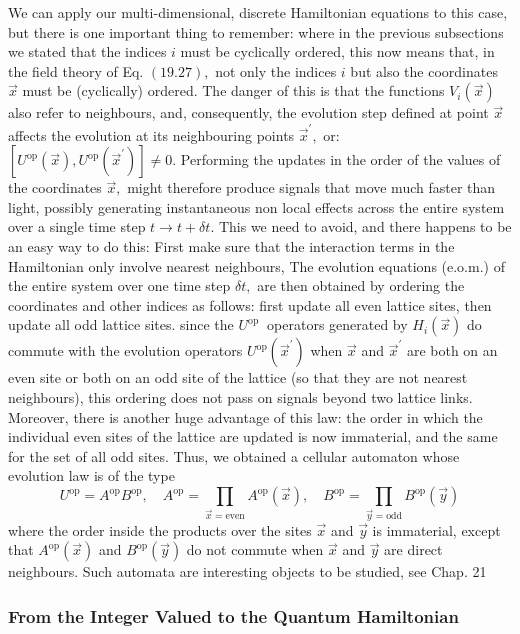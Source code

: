 \documentclass[main.tex]{subfiles}
\begin{document}
We can apply our multi-dimensional, discrete Hamiltonian equations to this case, but there is one important thing to remember: where in the previous subsections we stated that the indices $i$ must be cyclically ordered, this now means that, in the field theory of Eq. $(19.27),$ not only the indices $i$ but also the coordinates $\vec{x}$ must be (cyclically) ordered. The danger of this is that the functions $V_{i}(\vec{x})$ also refer to neighbours, and, consequently, the evolution step defined at point $\vec{x}$ affects the evolution at its neighbouring points $\vec{x}^{\prime},$ or: $\left[U^{\mathrm{op}}(\vec{x}), U^{\mathrm{op}}\left(\vec{x}^{\prime}\right)\right] \neq 0 .$ Performing the updates in the order of the values of the coordinates $\vec{x},$ might therefore produce signals that move much faster than light, possibly generating instantaneous non local effects across the entire system over a single time step $t \rightarrow t+\delta t .$ This we need to avoid, and there happens to be an easy way to do this:
First make sure that the interaction terms in the Hamiltonian only involve nearest neighbours, The evolution equations (e.o.m.) of the entire system over one time step $\delta t,$ are then obtained by ordering the coordinates and other indices as follows: first update all even lattice sites, then update all odd lattice sites.
since the $U^{\text {op }}$ operators generated by $H_{i}(\vec{x})$ do commute with the evolution operators $U^{\mathrm{op}}\left(\vec{x}^{\prime}\right)$ when $\vec{x}$ and $\vec{x}^{\prime}$ are both on an even site or both on an odd site of the lattice (so that they are not nearest neighbours), this ordering does not pass on signals beyond two lattice links. Moreover, there is another huge advantage of this law: the order in which the individual even sites of the lattice are updated is now immaterial, and the same for the set of all odd sites. Thus, we obtained a cellular automaton whose evolution law is of the type
$$
U^{\mathrm{op}}=A^{\mathrm{op}} B^{\mathrm{op}}, \quad A^{\mathrm{op}}=\prod_{\vec{x}=\mathrm{even}} A^{\mathrm{op}}(\vec{x}), \quad B^{\mathrm{op}}=\prod_{\vec{y}=\mathrm{odd}} B^{\mathrm{op}}(\vec{y})
$$
where the order inside the products over the sites $\vec{x}$ and $\vec{y}$ is immaterial, except that $A^{\mathrm{op}}(\vec{x})$ and $B^{\mathrm{op}}(\vec{y})$ do not commute when $\vec{x}$ and $\vec{y}$ are direct neighbours. Such automata are interesting objects to be studied, see Chap. 21


\subsubsection{From the Integer Valued to the Quantum Hamiltonian}\label{ch19.4.5}
\end{document}
